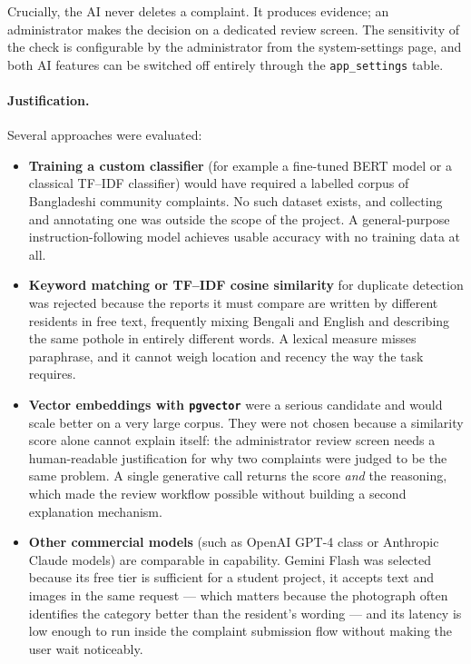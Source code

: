 \documentclass[11pt,a4paper]{article}
\newcommand{\code}[1]{\texttt{\small #1}}
\begin{document}
Crucially, the AI never deletes a complaint. It produces evidence; an
administrator makes the decision on a dedicated review screen. The sensitivity of
the check is configurable by the administrator from the system-settings page, and
both AI features can be switched off entirely through the \code{app\_settings}
table.

\paragraph{Justification.} Several approaches were evaluated:

\begin{itemize}[leftmargin=1.4em,itemsep=0.35em]
  \item \textbf{Training a custom classifier} (for example a fine-tuned BERT
        model or a classical TF--IDF classifier) would have required a labelled
        corpus of Bangladeshi community complaints. No such dataset exists, and
        collecting and annotating one was outside the scope of the project. A
        general-purpose instruction-following model achieves usable accuracy with
        no training data at all.
  \item \textbf{Keyword matching or TF--IDF cosine similarity} for duplicate
        detection was rejected because the reports it must compare are written by
        different residents in free text, frequently mixing Bengali and English
        and describing the same pothole in entirely different words. A lexical
        measure misses paraphrase, and it cannot weigh location and recency the
        way the task requires.
  \item \textbf{Vector embeddings with \code{pgvector}} were a serious candidate
        and would scale better on a very large corpus. They were not chosen
        because a similarity score alone cannot explain itself: the administrator
        review screen needs a human-readable justification for why two complaints
        were judged to be the same problem. A single generative call returns the
        score \emph{and} the reasoning, which made the review workflow possible
        without building a second explanation mechanism.
  \item \textbf{Other commercial models} (such as OpenAI GPT-4 class or Anthropic
        Claude models) are comparable in capability. Gemini Flash was selected
        because its free tier is sufficient for a student project, it accepts text
        and images in the same request --- which matters because the photograph
        often identifies the category better than the resident's wording --- and
        its latency is low enough to run inside the complaint submission flow
        without making the user wait noticeably.
\end{itemize}
\end{document}
